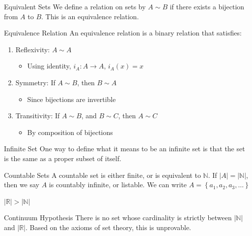 \documentclass[12pt]{article}
\begin{document}
\begin{definition}{Equivalent Sets}{}
    We define a relation on sets by $ A \sim B $ if there exists a bijection from $ A $ to $ B $. This is an equivalence relation.
\end{definition}
\begin{definition}{Equivalence Relation}{}
    An equivalence relation is a binary relation that satisfies:
    \begin{enumerate}
        \item Reflexivity: $ A \sim A $
        \begin{itemize}
            \item Using identity, $ i_A : A \to A $, $ i_A(x) = x $
        \end{itemize}
        \item Symmetry: If $ A \sim B $, then $ B \sim A $
        \begin{itemize}
            \item Since bijections are invertible
        \end{itemize}
        \item Transitivity: If $ A \sim B $, and $ B \sim C $, then $ A \sim C $
        \begin{itemize}
            \item By composition of bijections
        \end{itemize}
    \end{enumerate}
\end{definition}
\begin{definition}{Infinite Set}{}
    One way to define what it means to be an infinite set is that the set is the same as a proper subset of itself.
\end{definition}
\begin{definition}{Countable Sets}{}
    A countable set is either finite, or is equivalent to $ \mathbb{N} $. If $ |A| = |\mathbb{N}| $, then we say $ A $ is countably infinite, or listable. We can write $ A = \left\{ a_1, a_2, a_3, \dots \right\} $
\end{definition}
\begin{theorem}{}{}
    $ | \mathbb{R} | > | \mathbb{N} | $
\end{theorem}
\begin{definition}{Continuum Hypothesis}{}
    There is no set whose cardinality is strictly between $ | \mathbb{N} | $ and $ | \mathbb{R} | $.
    \medskip
    \newline
    Based on the axioms of set theory, this is unprovable.
\end{definition}
\end{document}
